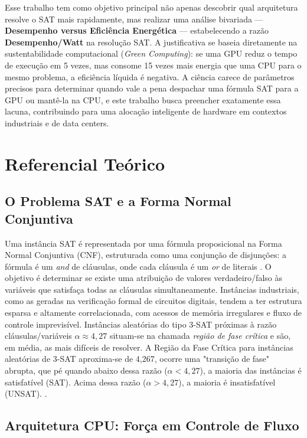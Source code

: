 \documentclass[12pt]{article}
\begin{document}
Esse trabalho tem como objetivo principal não apenas descobrir qual arquitetura resolve o SAT mais rapidamente, mas realizar uma análise bivariada — \textbf{Desempenho versus Eficiência Energética} — estabelecendo a razão \textbf{Desempenho/Watt} na resolução SAT. A justificativa se baseia diretamente na sustentabilidade computacional (\textit{Green Computing}): se uma GPU reduz o tempo de execução em 5 vezes, mas consome 15 vezes mais energia que uma CPU para o mesmo problema, a eficiência líquida é negativa. A ciência carece de parâmetros precisos para determinar quando vale a pena despachar uma fórmula SAT para a GPU ou mantê-la na CPU, e este trabalho busca preencher exatamente essa lacuna, contribuindo para uma alocação inteligente de hardware em contextos industriais e de data centers.

\section{Referencial Teórico}

\subsection{O Problema SAT e a Forma Normal Conjuntiva}

Uma instância SAT é representada por uma fórmula proposicional na Forma Normal Conjuntiva (CNF), estruturada como uma conjunção de disjunções: a fórmula é um \textit{and} de cláusulas, onde cada cláusula é um \textit{or} de literais \cite{biere:2009}. O objetivo é determinar se existe uma atribuição de valores verdadeiro/falso às variáveis que satisfaça todas as cláusulas simultaneamente. Instâncias industriais, como as geradas na verificação formal de circuitos digitais, tendem a ter estrutura esparsa e altamente correlacionada, com acessos de memória irregulares e fluxo de controle imprevisível. Instâncias aleatórias do tipo 3-SAT próximas à razão cláusulas/variáveis $\alpha \approx 4{,}27$ situam-se na chamada \textit{região de fase crítica} e são, em média, as mais difíceis de resolver.
A Região da Fase Crítica para instâncias aleatórias de 3-SAT aproxima-se de 4,267, ocorre uma "transição de fase" abrupta, que pé quando abaixo dessa razão (\(\alpha < 4,27\)), a maioria das instâncias é satisfatível (SAT). Acima dessa razão (\(\alpha > 4,27\)), a maioria é insatisfatível (UNSAT). \cite{garey:1979}.

\subsection{Arquitetura CPU: Força em Controle de Fluxo}
\end{document}

